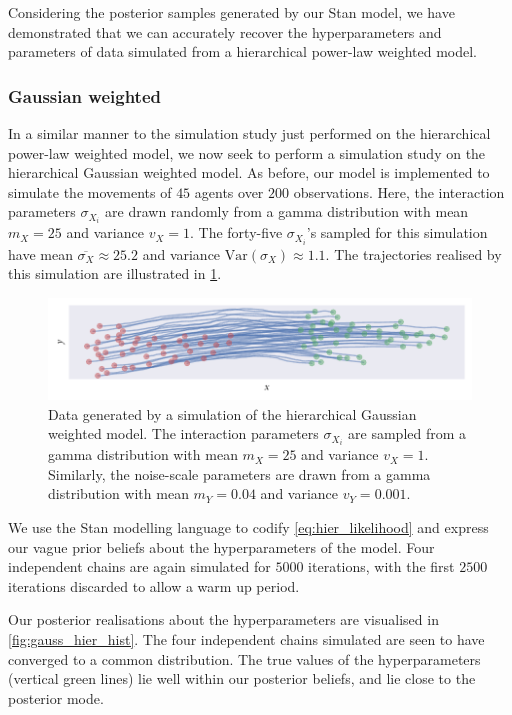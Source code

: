 Considering the posterior samples generated by our Stan model, we have demonstrated that
we can accurately recover the hyperparameters and parameters of data simulated from a
hierarchical power-law weighted model.

\subsubsection{Gaussian weighted}

In a similar manner to the simulation study just performed on the hierarchical power-law
weighted model, we now seek to perform a simulation study on the hierarchical Gaussian
weighted model. As before, our model is implemented to simulate the movements of $45$
agents over $200$ observations. Here, the interaction parameters $\sigma_{X_i}$ are drawn
randomly from a gamma distribution with mean $m_X=25$ and variance $v_X=1$. The forty-five
$\sigma_{X_i}$'s sampled for this simulation have mean $\overline{\sigma_X}\approx25.2$
and variance $\text{Var}(\sigma_X)\approx1.1$. The trajectories realised by this
simulation are illustrated in \cref{fig:gauss_hier_sim}.

\begin{figure}[tbp]
  \includegraphics{gauss_hier_sim.pdf}
  \caption{Data generated by a simulation of the hierarchical Gaussian weighted model.
    The interaction parameters $\sigma_{X_i}$ are sampled from a gamma distribution with
    mean $m_X=25$ and variance $v_X=1$. Similarly, the noise-scale parameters are drawn
    from a gamma distribution with mean $m_Y=0.04$ and variance $v_Y=0.001$.} 
  \label{fig:gauss_hier_sim}
\end{figure}

We use the Stan modelling language to codify \cref{eq:hier_likelihood} and express our
vague prior beliefs about the hyperparameters of the model. Four independent chains are
again simulated for $5000$ iterations, with the first $2500$ iterations discarded to allow
a warm up period.

Our posterior realisations about the hyperparameters are visualised in
\cref{fig:gauss_hier_hist}. The four independent chains simulated are seen to have
converged to a common distribution. The true values of the hyperparameters (vertical green
lines) lie well within our posterior beliefs, and lie close to the posterior mode.

